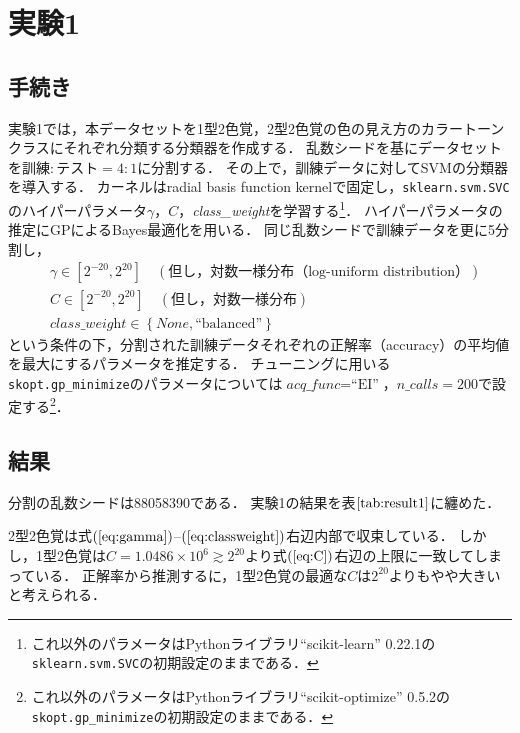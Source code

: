 \documentclass[uplatex,paper=a4,fontsize=4.0truemm,jafontsize=4.0truemm,head_space=30.0truemm,foot_space=30.0truemm,baselineskip=8.0truemm,line_length=40zw,gutter=25.0truemm,oneside,openany,fleqn,hanging_panctuation,open_bracket_pos=nibu_tentsuki,dvipdfmx,jis2004,book,titlepage]{jlreq}
\theoremstyle{mystyle}
\newcommand{\mathdisplaystyle}[1]{\(\displaystyle{#1}\)}
\newcommand{\Reference}[1]{\mathdisplaystyle{\ref{#1}}}
\newcommand{\Equationreference}[1]{\mathdisplaystyle{\parentheses{\ref{#1}}}}
\newcommand{\negativevalue}[1]{{-#1}}
\newcommand{\parentheses}[1]{\left(#1\right)}
\newcommand{\braces}[1]{\left\{#1\right\}}
\newcommand{\squarebrackets}[1]{\left[#1\right]}
\begin{document}
		\section{実験1}
			\subsection{手続き}
				実験1では，本データセットを1型2色覚，2型2色覚の色の見え方のカラートーンクラスにそれぞれ分類する分類器を作成する．
				乱数シードを基にデータセットを訓練\mathdisplaystyle{:}テスト\mathdisplaystyle{=4:1}に分割する．
				その上で，訓練データに対してSVMの分類器を導入する．
				カーネルはradial basis function kernelで固定し，\texttt{sklearn{.}svm{.}SVC}のハイパーパラメータ\mathdisplaystyle{\gamma}，\mathdisplaystyle{C}，\textit{class\_weight}を学習する\footnote{これ以外のパラメータはPythonライブラリ``scikit-learn'' 0.22.1の\texttt{sklearn{.}svm{.}SVC}の初期設定のままである．}．
				ハイパーパラメータの推定にGPによるBayes最適化を用いる．
				同じ乱数シードで訓練データを更に5分割し，
				\begin{align}
					&\gamma\in\squarebrackets{2^\negativevalue{20},2^{20}}\quad\parentheses{\textrm{但し，対数一様分布（log-uniform distribution）}}\label{eq:gamma}\\
					&C\in\squarebrackets{2^\negativevalue{20},2^{20}}\quad\parentheses{\textrm{但し，対数一様分布}}\label{eq:C}\\
					&\textit{class\_weight}\in\braces{\textit{None},\textrm{``balanced''}}\label{eq:classweight}
				\end{align}
				という条件の下，分割された訓練データそれぞれの正解率（accuracy）の平均値を最大にするパラメータを推定する．
				チューニングに用いる\texttt{skopt{.}gp\_minimize}のパラメータについては\mathdisplaystyle{\textit{acq\_func}=\textrm{``EI''}}，\mathdisplaystyle{\textit{n\_calls}=200}で設定する\footnote{これ以外のパラメータはPythonライブラリ``scikit-optimize'' 0.5.2の\texttt{\texttt{skopt{.}gp\_minimize}}の初期設定のままである．}．
			\subsection{結果}
				分割の乱数シードは88058390である．
				実験1の結果を表\Reference{tab:result1}に纏めた．

				2型2色覚は式\Equationreference{eq:gamma}--\Equationreference{eq:classweight}右辺内部で収束している．
				しかし，1型2色覚は\mathdisplaystyle{C=1.0486\times10^6\gtrsim2^{20}}より式\Equationreference{eq:C}右辺の上限に一致してしまっている．
				正解率から推測するに，1型2色覚の最適な\mathdisplaystyle{C}は\mathdisplaystyle{2^{20}}よりもやや大きいと考えられる．
\end{document}
